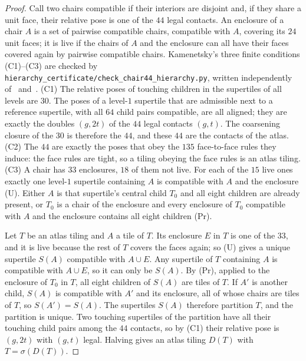 \documentclass[11pt]{article}
\theoremstyle{definition}
\theoremstyle{remark}
\newcommand{\code}[1]{\texttt{#1}}
\begin{document}
\begin{proof}
Call two chairs compatible if their interiors are disjoint and, if they share a unit face, their relative pose is one of
the $44$ legal contacts.  An enclosure of a chair $A$ is a set of pairwise compatible chairs, compatible with $A$, covering
its $24$ unit faces; it is live if the chairs of $A$ and the enclosure can all have their faces covered again by pairwise
compatible chairs.  Kamenetsky's three finite conditions (C1)--(C3) are checked by
\code{hierarchy\_certificate/check\_chair44\_hierarchy.py}, written independently of~\cite{Kamenetsky}
and~\cite{Romanov}.
(C1) The relative poses of touching children in the supertiles of all levels are $30$.  The poses of a level-$1$
supertile that are admissible next to a reference supertile, with all $64$ child pairs compatible, are all aligned; they
are exactly the doubles $(g,2t)$ of the $44$ legal contacts $(g,t)$.  The coarsening closure of the $30$ is therefore the
$44$, and these $44$ are the contacts of the atlas.
(C2) The $44$ are exactly the poses that obey the $135$ face-to-face rules they induce: the face rules are tight, so a
tiling obeying the face rules is an atlas tiling.
(C3) A chair has $33$ enclosures, $18$ of them not live.  For each of the $15$ live ones exactly one level-$1$ supertile
containing $A$ is compatible with $A$ and the enclosure (U).  Either $A$ is that supertile's central child $T_{0}$ and all
eight children are already present, or $T_{0}$ is a chair of the enclosure and every enclosure of $T_{0}$ compatible with
$A$ and the enclosure contains all eight children (Pr).

Let $T$ be an atlas tiling and $A$ a tile of $T$.  Its enclosure $E$ in $T$ is one of the $33$, and it is live because
the rest of $T$ covers the faces again; so (U) gives a unique supertile $S(A)$ compatible with $A\cup E$.  Any supertile
of $T$ containing $A$ is compatible with $A\cup E$, so it can only be $S(A)$.  By (Pr), applied to the enclosure of
$T_{0}$ in $T$, all eight children of $S(A)$ are tiles of $T$.  If $A'$ is another child, $S(A)$ is compatible with
$A'$ and its enclosure, all of whose chairs are tiles of $T$, so $S(A')=S(A)$.  The supertiles $S(A)$ therefore
partition $T$, and the partition is unique.  Two touching supertiles of the partition have all their touching child
pairs among the $44$ contacts, so by (C1) their relative pose is $(g,2t)$ with $(g,t)$ legal.  Halving gives an atlas
tiling $D(T)$ with $T=\sigma(D(T))$.
\end{proof}
\end{document}
